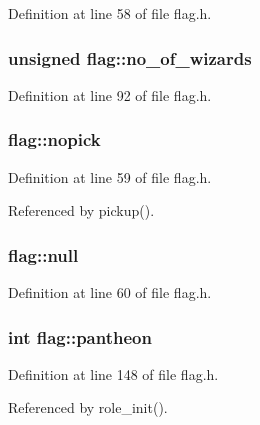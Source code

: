 Definition at line 58 of file flag.\+h.

\hypertarget{structflag_a234ec46fbb73d319d628aa1cc320be8b}{
\subsubsection[{no\+\_\+of\+\_\+wizards}]{\setlength{\rightskip}{0pt plus 5cm}unsigned flag\+::no\+\_\+of\+\_\+wizards}}\label{structflag_a234ec46fbb73d319d628aa1cc320be8b}


Definition at line 92 of file flag.\+h.

\hypertarget{structflag_aa4b99330f9e778677955c013004aef15}{
\subsubsection[{nopick}]{ flag\+::nopick}}\label{structflag_aa4b99330f9e778677955c013004aef15}


Definition at line 59 of file flag.\+h.



Referenced by pickup().

\hypertarget{structflag_a480c7b571ea5d87aebd00db2574f012e}{
\subsubsection[{null}]{ flag\+::null}}\label{structflag_a480c7b571ea5d87aebd00db2574f012e}


Definition at line 60 of file flag.\+h.

\hypertarget{structflag_a845a1767e4894171f7364a6122a0e09c}{
\subsubsection[{pantheon}]{\setlength{\rightskip}{0pt plus 5cm}int flag\+::pantheon}}\label{structflag_a845a1767e4894171f7364a6122a0e09c}


Definition at line 148 of file flag.\+h.



Referenced by role\+\_\+init().

